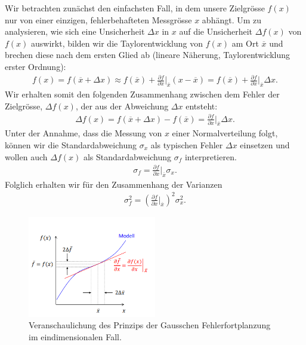 Wir betrachten zunächst den einfachsten Fall, in dem unsere Zielgrösse $f (x)$ nur von einer einzigen, fehlerbehafteten Messgrösse $x$ abhängt. Um zu analysieren, wie sich eine Unsicherheit $\Delta x$ in $x$ auf die Unsicherheit  $\Delta f(x) $ von $f (x)$ auswirkt, bilden wir die  Taylorentwicklung von $f(x)$ am Ort $\overline{x}$ und brechen diese nach dem ersten Glied ab (lineare Näherung, Taylorentwicklung erster Ordnung):
\begin{align}
f(x)  = f ( \overline{x} + \Delta x ) \approx f ( \overline{x} ) + \frac{\partial f}{\partial x}\bigg|_{\overline{x}} \left( x - \overline{x} \right) = f ( \overline{x} ) + \frac{\partial f}{\partial x}\bigg|_{\overline{x}} \Delta x.
\end{align}
Wir erhalten somit den folgenden Zusammenhang zwischen dem Fehler der Zielgrösse, $\Delta f(x) $, der aus der Abweichung  $\Delta x$ entsteht:
\begin{align}
\Delta f(x) =  f ( \overline{x} + \Delta x ) - f ( \overline{x} )  =  \frac{\partial f}{\partial x}\bigg|_{\overline{x}} \Delta x.
\end{align}
Unter der Annahme, dass die Messung von $x$ einer Normalverteilung folgt, können wir die Standardabweichung $\sigma_x$ als  typischen Fehler $\Delta x$ einsetzen und wollen auch $\Delta f(x)$ als Standardabweichung $\sigma_f$ interpretieren.  
\begin{align}
\sigma_f =   \frac{\partial f}{\partial x}\bigg|_{\overline{x}} \sigma_x.
\end{align}
Folglich erhalten wir für den Zusammenhang der Varianzen
\begin{align}
\sigma_f^2 = \left( \frac{\partial f}{\partial x}\bigg|_{\overline{x}} \right)^2\sigma_x^2.
\end{align}

\begin{figure}[H]
\centering
\includegraphics[width=0.5\textwidth]{Figures/gauss1D.png}
\caption{Veranschaulichung des Prinzips der Gausschen Fehlerfortplanzung im eindimensionalen Fall.}
\end{figure}

